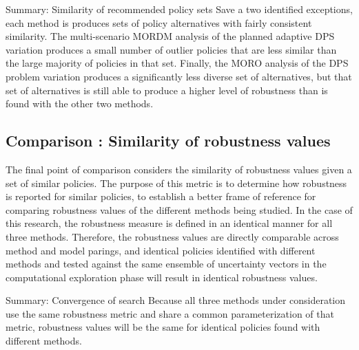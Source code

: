     \begin{comparisonbox}{Summary: Similarity of recommended policy sets}
        Save a two identified exceptions, each method is produces sets of policy alternatives with fairly consistent similarity. The multi-scenario MORDM analysis of the planned adaptive DPS variation produces a small number of outlier policies that are less similar than the large majority of policies in that set. Finally, the MORO analysis of the DPS problem variation produces a significantly less diverse set of alternatives, but that set of alternatives is still able to produce a higher level of robustness than is found with the other two methods. 
    \end{comparisonbox}
    
    \subsection{Comparison \thecomparison : Similarity of robustness values} 
    The final point of comparison considers the similarity of robustness values given a set of similar policies. The purpose of this metric is to determine how robustness is reported for similar policies, to establish a better frame of reference for comparing robustness values of the different methods being studied. In the case of this research, the robustness measure is defined in an identical manner for all three methods. Therefore, the robustness values are directly comparable across method and model parings, and identical policies identified with different methods and tested against the same ensemble of uncertainty vectors in the computational exploration phase will result in identical robustness values. 
    
     \begin{comparisonbox}{Summary: Convergence of search}
        Because all three methods under consideration use the same robustness metric and share a common parameterization of that metric, robustness values will be the same for identical policies found with different methods. 
    \end{comparisonbox}
        